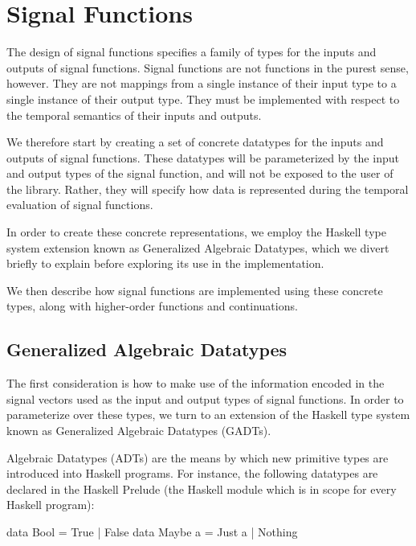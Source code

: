 \section{Signal Functions}
\label{section:Implementation-Signal_Functions}

The design of signal functions specifies a family of types for the inputs and
outputs of signal functions. Signal functions are not functions in the purest
sense, however. They are not mappings from a single instance of their input
type to a single instance of their output type. They must be implemented with
respect to the temporal semantics of their inputs and outputs.

We therefore start by creating a set of concrete datatypes for the inputs and
outputs of signal functions. These datatypes will be parameterized by the input
and output types of the signal function, and will not be exposed to the user of
the library. Rather, they will specify how data is represented during the
temporal evaluation of signal functions.

In order to create these concrete representations, we employ the Haskell type
system extension known as Generalized Algebraic Datatypes, which we divert
briefly to explain before exploring its use in the implementation.

We then describe how signal functions are implemented using these concrete
types, along with higher-order functions and continuations.

\subsection{Generalized Algebraic Datatypes}
\label{subsection:Implementation-Signal_Functions-Generalized_Algebraic_Datatypes}
The first consideration is how to make use of the information encoded in the
signal vectors used as the input and output types of signal functions. In order
to parameterize over these types, we turn to an extension of the Haskell type
system known as Generalized Algebraic Datatypes (GADTs).

Algebraic Datatypes (ADTs) are the means by which new primitive types are
introduced into Haskell programs. For instance, the following datatypes are
declared in the Haskell Prelude (the Haskell module which is in scope for every
Haskell program):

\begin{code}
data Bool    = True   | False
data Maybe a = Just a | Nothing
\end{code}

